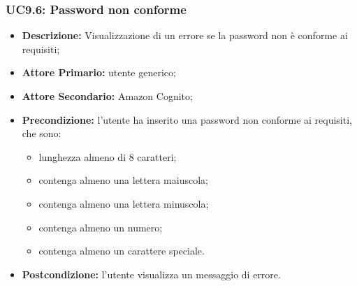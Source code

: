 \subsubsection{UC9.6: Password non conforme}
\label{sec:UC9.6}
\begin{itemize}
    \item \textbf{Descrizione:} Visualizzazione di un errore se la password non è conforme ai requisiti;
    \item \textbf{Attore Primario:} utente generico;
    \item \textbf{Attore Secondario:} Amazon Cognito;
    \item \textbf{Precondizione:} l'utente ha inserito una password non conforme ai requisiti, che sono:
          \begin{itemize}
              \item lunghezza almeno di 8 caratteri;
              \item contenga almeno una lettera maiuscola;
              \item contenga almeno una lettera minuscola;
              \item contenga almeno un numero;
              \item contenga almeno un carattere speciale.
          \end{itemize}
    \item \textbf{Postcondizione:} l'utente visualizza un messaggio di errore.
\end{itemize}